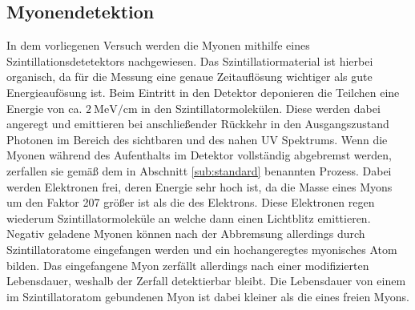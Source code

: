\subsection{Myonendetektion}
In dem vorliegenen Versuch werden die Myonen mithilfe eines Szintillationsdetetektors nachgewiesen. Das Szintillatiormaterial ist hierbei organisch, da für die Messung eine genaue Zeitauflösung wichtiger als gute Energieaufösung ist. Beim Eintritt in den Detektor deponieren die Teilchen eine Energie von ca. $\SI{2}{\mega\electronvolt\per\centi\meter}$ in den Szintillatormolekülen. Diese werden dabei angeregt und emittieren bei anschließender Rückkehr in den Ausgangszustand Photonen im Bereich des sichtbaren und des nahen UV Spektrums. Wenn die Myonen während des Aufenthalts im Detektor vollständig abgebremst werden, zerfallen sie gemäß dem in Abschnitt \ref{sub:standard} benannten Prozess. Dabei werden Elektronen frei, deren Energie sehr hoch ist, da die Masse eines Myons um den Faktor 207 größer ist als die des Elektrons. Diese Elektronen regen wiederum Szintillatormoleküle an welche dann einen Lichtblitz emittieren. Negativ geladene Myonen können nach der Abbremsung allerdings durch Szintillatoratome eingefangen werden und ein hochangeregtes myonisches Atom bilden. Das eingefangene Myon zerfällt allerdings nach einer modifizierten Lebensdauer, weshalb der Zerfall detektierbar bleibt. Die Lebensdauer von einem im Szintillatoratom gebundenen Myon ist dabei kleiner als die eines freien Myons.
